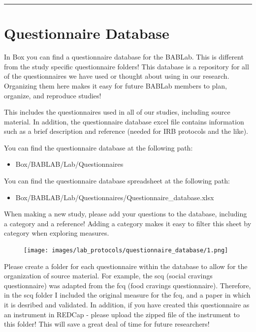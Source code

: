\documentclass[
]{book}
\providecommand{\tightlist}{%
  \setlength{\itemsep}{0pt}\setlength{\parskip}{0pt}}
\begin{document}
\begin{center}\rule{0.5\linewidth}{0.5pt}\end{center}

\hypertarget{questionnaire-database}{%
\section{Questionnaire Database}\label{questionnaire-database}}

In Box you can find a questionnaire database for the BABLab. This is different from the study specific questionnaire folders! This database is a repository for all of the questionnaires we have used or thought about using in our research. Organizing them here makes it easy for future BABLab members to plan, organize, and reproduce studies!

This includes the questionnaires used in all of our studies, including source material. In addition, the questionnaire database excel file contains information such as a brief description and reference (needed for IRB protocols and the like).

You can find the questionnaire database at the following path:

\begin{itemize}
\tightlist
\item
  Box/BABLAB/Lab/Questionnaires
\end{itemize}

You can find the questionnaire database spreadsheet at the following path:

\begin{itemize}
\tightlist
\item
  Box/BABLAB/Lab/Questionnaires/Questionnaire\_database.xlsx
\end{itemize}

When making a new study, please add your questions to the database, including a category and a reference! Adding a category makes it easy to filter this sheet by category when exploring measures.

\begin{figure}
\centering
\texttt{[image: images/lab\_protocols/questionnaire\_database/1.png]}
\caption{}
\end{figure}

Please create a folder for each questionnaire within the database to allow for the organization of source material. For example, the scq (social cravings questionnaire) was adapted from the fcq (food cravings questionnaire). Therefore, in the scq folder I included the original measure for the fcq, and a paper in which it is desribed and validated. In addition, if you have created this questionnaire as an instrument in REDCap - please upload the zipped file of the instrument to this folder! This will save a great deal of time for future researchers!
\end{document}

